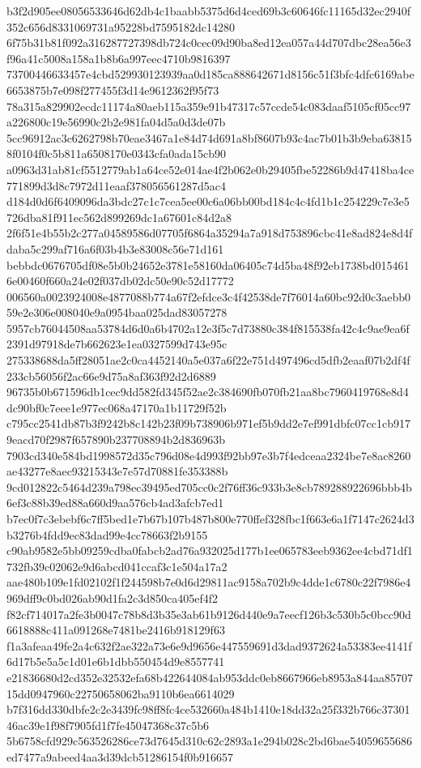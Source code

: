 \documentclass[11pt,a4paper]{article}
\begin{document}
{b3f2d905ee08056533646d62db4c1baabb5375d6d4ced69b3c60646fc11165d32ec2940f352c656d8331069731a95228bd7595182dc14280
6f75b31b81f092a316287727398db724c0cec09d90ba8ed12ea057a44d707dbc28ea56e3f96a41c5008a158a1b8b6a997eec4710b9816397
73700446633457e4cbd529930123939aa0d185ca888642671d8156c51f3bfc4dfc6169abe6653875b7e098f277455f3d14e9612362f95f73
78a315a829902ecdc11174a80aeb115a359e91b47317c57ccde54c083daaf5105cf05cc97a226800c19e56990c2b2e981fa04d5a0d3de07b
5cc96912ac3c6262798b70eae3467a1e84d74d691a8bf8607b93c4ac7b01b3b9eba638158f0104f0c5b811a6508170e0343cfa0ada15cb90
a0963d31ab81cf5512779ab1a64ce52e014ae4f2b062e0b29405fbe52286b9d47418ba4ce771899d3d8c7972d11eaaf378056561287d5ac4
d184d0d6f6409096da3bdc27c1c7cea5ee00c6a06bb00bd184c4c4fd1b1c254229c7e3e5726dba81f911ec562d899269dc1a67601c84d2a8
2f6f51e4b55b2c277a04589586d07705f6864a35294a7a918d753896cbc41e8ad824e8d4fdaba5c299af716a6f03b4b3e83008c56e71d161
bebbdc0676705df08e5b0b24652e3781e58160da06405c74d5ba48f92eb1738bd0154616e00460f660a24e02f037db02dc50e90c52d17772
006560a0023924008e4877088b774a67f2efdce3c4f42538de7f76014a60bc92d0c3aebb059e2e306e008040e9a0954baa025dad83057278
5957cb76044508aa53784d6d0a6b4702a12e3f5c7d73880c384f815538fa42c4c9ae9ea6f2391d97918de7b662623e1ea0327599d743e95c
275338688da5ff28051ae2c0ca4452140a5e037a6f22e751d497496cd5dfb2eaaf07b2df4f233cb56056f2ac66e9d75a8af363f92d2d6889
96735b0b671596db1cec9dd582fd345f52ae2c384690fb070fb21aa8bc7960419768e8d4dc90bf0c7eee1e977ec068a47170a1b11729f52b
c795cc2541db87b3f9242b8c142b23f09b738906b971ef5b9dd2e7ef991dbfc07cc1cb9179eacd70f2987f657890b237708894b2d836963b
7903cd340e584bd1998572d35c796d08e4d993f92bb97e3b7f4edceaa2324be7e8ac8260ae43277e8aec93215343e7e57d70881fe353388b
9cd012822c5464d239a798ec39495ed705cc0c2f76ff36c933b3e8cb789288922696bbb4b6ef3c88b39ed88a660d9aa576cb4ad3afcb7ed1
b7ec0f7c3ebebf6c7ff5bed1e7b67b107b487b800e770ffef328fbc1f663e6a1f7147c2624d3b3276b4fdd9ec83dad99e4cc78663f2b9155
c90ab9582e5bb09259cdba0fabcb2ad76a932025d177b1ee065783eeb9362ee4cbd71df1732fb39c02062e9d6abcd041ccaf3c1e504a17a2
aae480b109e1fd02102f1f244598b7e0d6d29811ac9158a702b9c4dde1c6780c22f7986e4969dff9c0bd026ab90d1fa2c3d850ca405ef4f2
f82cf714017a2fe3b0047c78b8d3b35e3ab61b9126d440e9a7eecf126b3c530b5c0bcc90d6618888c411a091268e7481be2416b918129f63
f1a3afeaa49fe2a4c632f2ae322a73e6e9d9656e447559691d3dad9372624a53383ee4141f6d17b5e5a5c1d01e6b1dbb550454d9e8557741
e21836680d2cd352e32532efa68b422644084ab953ddc0eb8667966eb8953a844aa8570715dd0947960c22750658062ba9110b6ea6614029
b7f316dd330dbfe2c2e3439fc98ff8fc4ce532660a484b1410e18dd32a25f332b766c3730146ac39e1f98f7905fd1f7fe45047368c37c5b6
5b6758cfd929c563526286ce73d7645d310c62c2893a1e294b028c2bd6bae54059655686ed7477a9abeed4aa3d39dcb51286154f0b916657
}
\end{document}

